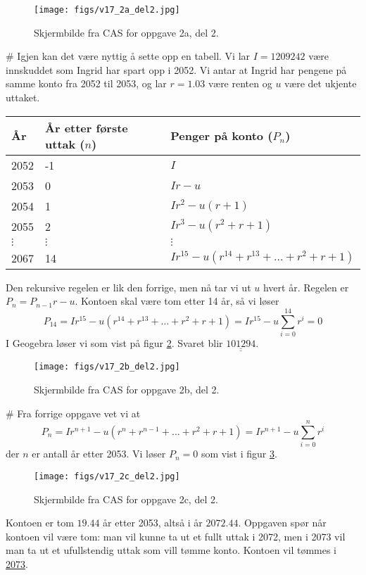 \documentclass[12pt, a4paper]
{article}						%
\def\answer#1{\underline{\underline{#1}}}
\begin{document}
\begin{easylist}[enumerate]
	\begin{figure}[th!]
		\centering
		\texttt{[image: figs/v17\_2a\_del2.jpg]}
		\caption{Skjermbilde fra CAS for oppgave 2a, del 2.}
		\label{fig:cas1}
	\end{figure}
	# Igjen kan det være nyttig å sette opp en tabell.
	Vi lar $I = 1209242$ være innskuddet som Ingrid har spart opp i 2052. Vi antar at Ingrid har pengene på samme konto fra 2052 til 2053, og lar $r = 1.03$ være renten og $u$ være det ukjente uttaket.
		\begin{center}
		\begin{tabular}{lll}
			\textbf{År} & \textbf{År etter første uttak} ($n$) & \textbf{Penger på konto} ($P_n$) \\ \hline
			2052 & -1 & $I$ \\
			2053 & 0 & $Ir - u$ \\
			2054 & 1 & $Ir^2 - u(r+1)$ \\
			2055 & 2 & $Ir^3 - u(r^2 + r+1)$ \\
			$\vdots$ & $\vdots$ & $\vdots$ \\
			2067 & 14 & $Ir^{15} - u (r^{14} + r^{13} + \dots + r^2 + r + 1)$
		\end{tabular}
	\end{center}
	Den rekursive regelen er lik den forrige, men nå tar vi ut $u$ hvert år. Regelen er $P_n = P_{n-1}r - u$. Kontoen skal være tom etter 14 år, så vi løser
	\begin{equation*}
		P_{14} = Ir^{15} - u (r^{14} + r^{13} + \dots + r^2 + r + 1) = Ir^{15} - u \sum_{i = 0}^{14} r^i = 0
	\end{equation*}
	I Geogebra løser vi som vist på figur \ref{fig:cas2}. Svaret blir $\answer{101294}$.
	\begin{figure}[th!]
		\centering
		\texttt{[image: figs/v17\_2b\_del2.jpg]}
		\caption{Skjermbilde fra CAS for oppgave 2b, del 2.}
		\label{fig:cas2}
	\end{figure}
	

	# Fra forrige oppgave vet vi at
	\begin{equation*}
		P_{n} = Ir^{n+1} - u (r^{n} + r^{n-1} + \dots + r^2 + r + 1) = Ir^{n+1} - u \sum_{i = 0}^{n} r^i
	\end{equation*}
	der $n$ er antall år etter 2053.
	Vi løser $P_n = 0$ som vist i figur \ref{fig:cas3}.
	\begin{figure}[th!]
		\centering
		\texttt{[image: figs/v17\_2c\_del2.jpg]}
		\caption{Skjermbilde fra CAS for oppgave 2c, del 2.}
		\label{fig:cas3}
	\end{figure}
	Kontoen er tom $19.44$ år etter 2053, altså i år $2072.44$.
	Oppgaven spør når kontoen vil være tom:
	man vil kunne ta ut et fullt uttak i 2072, men i 2073 vil man ta ut et ufullstendig uttak som vill tømme konto. Kontoen vil tømmes i \answer{2073}.
\end{easylist}
\end{document}
